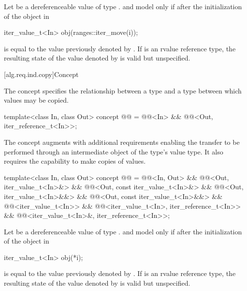 \pnum
Let  be a dereferenceable value of type .
 and  model 
only if after the initialization of the object  in
\begin{codeblock}
iter_value_t<In> obj(ranges::iter_move(i));
\end{codeblock}
 is equal to the value previously denoted by . If
 is an rvalue reference type,
the resulting state of the value denoted by  is
valid but unspecified.

[alg.req.ind.copy]{Concept }

\pnum
The  concept specifies the relationship between
a  type and a  type
between which values may be copied.

\begin{codeblock}
template<class In, class Out>
  concept @@ =
    @@<In> &&
    @@<Out, iter_reference_t<In>>;
\end{codeblock}

\pnum
The  concept augments
 with additional requirements enabling
the transfer to be performed through an intermediate object of the
 type's value type. It also requires the capability
to make copies of values.

\begin{codeblock}
template<class In, class Out>
  concept @@ =
    @@<In, Out> &&
    @@<Out, iter_value_t<In>&> &&
    @@<Out, const iter_value_t<In>&> &&
    @@<Out, iter_value_t<In>&&> &&
    @@<Out, const iter_value_t<In>&&> &&
    @@<iter_value_t<In>> &&
    @@<iter_value_t<In>, iter_reference_t<In>> &&
    @@<iter_value_t<In>&, iter_reference_t<In>>;
\end{codeblock}

\pnum
Let  be a dereferenceable value of type .
 and  model 
only if after the initialization of the object  in
\begin{codeblock}
iter_value_t<In> obj(*i);
\end{codeblock}
 is equal to the value previously denoted by . If
 is an rvalue reference type, the resulting state
of the value denoted by  is
valid but unspecified.

